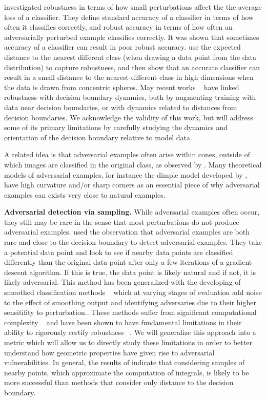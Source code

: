 \citet{tsipras2018robustness} investigated robustness in terms of how
small perturbations affect the the average loss of a classifier. They
define standard accuracy of a classifier in terms of how often it
classifies correctly, and robust accuracy in terms of how often an
adversarially perturbed example classifies correctly. It was shown
that sometimes accuracy of a classifier can result in poor robust
accuracy. \citet{gilmer2018adversarial} use the expected distance to
the nearest different class (when drawing a data point from the data
distribution) to capture robustness, and then show that an accurate
classifier can result in a small distance to the nearest different
class in high dimensions when the data is drawn from concentric
spheres. May recent works ~\citep{he2018decision, chen2023aware,
  jin2022roby} have linked robustness with decision boundary dynamics,
buth by augmenting training with data near decision boundaries, or
with dynamics related to distances from decision boundaries. We
acknowledge the validity of this work, but will address some of its
primary limitations by carefully studying the dynamics and orientation
of the decision boundary relative to model data.

A related idea is that adversarial examples often arise within cones,
outside of which images are classified in the original class, as
observed by \citet{roth19aodds}. Many theoretical models of
adversarial examples, for instance the dimple model developed by
\citet{shamir2021}, have high curvature and/or sharp corners as an
essential piece of why adversarial examples can exists very close to
natural examples. 

{\bf Adversarial detection via sampling.}
While adversarial examples often occur, they still may be rare in the
sense that most perturbations do not produce adversarial
examples. \citet{yu2019new} used the observation that adversarial
examples are both rare and close to the decision boundary to detect
adversarial examples. They take a potential data point and look to see
if nearby data points are classified differently than the original
data point after only a few iterations of a gradient descent
algorithm. If this is true, the data point is likely natural and if
not, it is likely adversarial. This method has been generalized with
the developing of smoothed classification methods
~\citep{cohen2019certified, lecuyer2019certified, li2019certified}
which at varying stages of evaluation add noise to the effect of
smoothing output and identifying adversaries due to their higher
sensitifity to perturbation.. These methods suffer from significant
computational complexity ~\citep{kumar2020curse} and have been shown
to have fundamental limitations in their ability to rigorously certify
robustness ~\citep{blum2020random, yang2020randomized}. We will generalize this approach into a metric which will allow us to directly study these limitations in order to better understand how geometric properties have given rise to adversarial vulnerabilities. In general, the results of \citet{yu2019new} indicate that considering samples of nearby points, which approximate the computation of integrals, is likely to be more successful than methods that consider only distance to the decision boundary.

